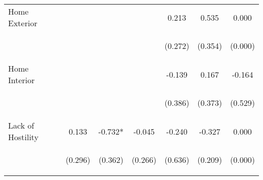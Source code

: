 \begin{tabular}{lcccccc}
\noalign{\smallskip}Home Exterior &  &  &  & 0.213 & 0.535 & 0.000\\
 & \begin{footnotesize}\end{footnotesize} & \begin{footnotesize}\end{footnotesize} & \begin{footnotesize}\end{footnotesize} & \begin{footnotesize}(0.272)\end{footnotesize} & \begin{footnotesize}(0.354)\end{footnotesize} & \begin{footnotesize}(0.000)\end{footnotesize}\\
\noalign{\smallskip}Home Interior &  &  &  & -0.139 & 0.167 & -0.164\\
 & \begin{footnotesize}\end{footnotesize} & \begin{footnotesize}\end{footnotesize} & \begin{footnotesize}\end{footnotesize} & \begin{footnotesize}(0.386)\end{footnotesize} & \begin{footnotesize}(0.373)\end{footnotesize} & \begin{footnotesize}(0.529)\end{footnotesize}\\
\noalign{\smallskip}Lack of Hostility & 0.133 & -0.732* & -0.045 & -0.240 & -0.327 & 0.000\\
 & \begin{footnotesize}(0.296)\end{footnotesize} & \begin{footnotesize}(0.362)\end{footnotesize} & \begin{footnotesize}(0.266)\end{footnotesize} & \begin{footnotesize}(0.636)\end{footnotesize} & \begin{footnotesize}(0.209)\end{footnotesize} & \begin{footnotesize}(0.000)\end{footnotesize}\\

\end{tabular}
